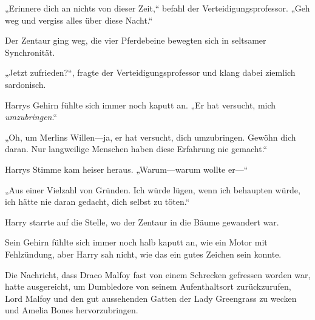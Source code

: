 „Erinnere dich an nichts von dieser Zeit,“ befahl der Verteidigungsprofessor.
„Geh weg und vergiss alles über diese Nacht.“

Der Zentaur ging weg, die vier Pferdebeine bewegten sich in seltsamer Synchronität.

„Jetzt zufrieden?“, fragte der Verteidigungsprofessor und klang dabei ziemlich sardonisch.

Harrys Gehirn fühlte sich immer noch kaputt an.
„Er hat versucht, mich \emph{umzubringen}.“

„Oh, um Merlins Willen—ja, er hat versucht, dich umzubringen. Gewöhn dich daran. Nur langweilige Menschen haben diese Erfahrung nie gemacht.“

Harrys Stimme kam heiser heraus. „Warum—warum wollte er—“

„Aus einer Vielzahl von Gründen. Ich würde lügen, wenn ich behaupten würde, ich hätte nie daran gedacht, dich selbst zu töten.“

Harry starrte auf die Stelle, wo der Zentaur in die Bäume gewandert war.

Sein Gehirn fühlte sich immer noch halb kaputt an, wie ein Motor mit Fehlzündung, aber Harry sah nicht, wie das ein gutes Zeichen sein konnte.

\later

Die Nachricht, dass Draco Malfoy fast von einem Schrecken gefressen worden war, hatte ausgereicht, um Dumbledore von seinem Aufenthaltsort zurückzurufen, Lord Malfoy und den gut aussehenden Gatten der Lady Greengrass zu wecken und Amelia Bones hervorzubringen.

